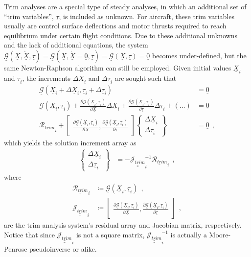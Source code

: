 \documentclass[12pt,a4paper,oneside,english]{abntex2} %
\newcommand{\fix}[1]{{\color{red}#1}}
\newcommand{\vect}[1]{\underline{#1}}
\newcommand{\del}[2]{\frac{\partial#1}{\partial#2}}
\def\tens#1{\underline{\underline{#1}}}
\def\lp{\left(}
\def\rp{\right)}
\def\zv{\vect{0}}
\def\Sys{\mathcal{\vect{G}}}
\def\X{\vect{X}}
\def\Xi{\X_i}
\def\Xdot{\dot{\X}}
\begin{document}
Trim analyses are a special type of steady analyses, in which an additional set of ``trim variables'', $\vect{\tau}$, is included as unknown. For aircraft, these trim variables usually are control surface deflections and motor thrusts required to reach equilibrium under certain flight conditions. Due to these additional unknowns and the lack of additional equations, the system $\Sys\lp\X,\Xdot,\vect{\tau}\rp=\Sys\lp\X,\Xdot=\zv,\vect{\tau}\rp=\Sys\lp\X,\vect{\tau}\rp=\zv$ becomes under-defined, but the same Newton-Raphson algorithm can still be employed. Given initial values $\Xi$ and $\vect{\tau}_i$, the increments $\Delta\Xi$ and $\Delta\vect{\tau}_i$ are sought such that 
\begin{align}
    \Sys\lp\Xi+\Delta\Xi,\vect{\tau}_i+\Delta\vect{\tau}_i\rp &= \zv \nonumber
    \\
    \Sys\lp\Xi,\vect{\tau}_i\rp + \del{\Sys\lp\Xi,\vect{\tau}_i\rp}{\X}\Delta\Xi + \del{\Sys\lp\Xi,\vect{\tau}_i\rp}{\vect{\tau}}\Delta\vect{\tau}_i +\lp\ldots\rp
    &= \zv \nonumber
    \\
    \vect{\mathcal{R}_{trim}}_i + \begin{bmatrix} \del{\Sys\lp\Xi,\vect{\tau}_i\rp}{\X}, \del{\Sys\lp\Xi,\vect{\tau}_i\rp}{\vect{\tau}}
    \end{bmatrix} \begin{Bmatrix} \Delta\Xi \\ \Delta\vect{\tau}_i \end{Bmatrix} &= \zv
    \ \ , \label{eq:sys_trim}
\end{align}
which yields the solution increment array as
\begin{align}
     \begin{Bmatrix} \Delta\Xi \\ \Delta\vect{\tau}_i \end{Bmatrix} &= -\tens{\mathcal{J}_{trim}}_i^{-1} \vect{\mathcal{R}_{trim}}_i \ \ ,
    \label{eq:sys_trim_sol}
\end{align}
where 
\begin{align}
    \vect{\mathcal{R}_{trim}}_i &\coloneqq \Sys\lp\Xi,\vect{\tau}_i\rp
    \ \ , \label{eq:Res_trim}
    \\
    \tens{\mathcal{J}_{trim}}_i &\coloneqq \begin{bmatrix} \del{\Sys\lp\Xi,\vect{\tau}_i\rp}{\X}, \del{\Sys\lp\Xi,\vect{\tau}_i\rp}{\vect{\tau}}
    \end{bmatrix} \ \ ,
    \label{eq:JacSys_trim}
\end{align}
are the trim analysis system's residual array and Jacobian matrix, respectively. Notice that since $\tens{\mathcal{J}_{trim}}_i$ is not a square matrix, $\tens{\mathcal{J}_{trim}}_i^{-1}$ is actually a Moore-Penrose pseudoinverse \fix{or alike}.
\end{document}
